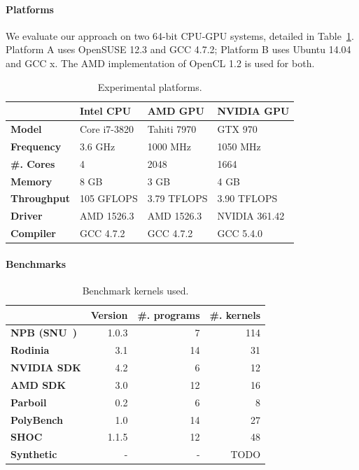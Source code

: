 \documentclass[preprint,nonatbib,10pt,nocopyrightspace]{sigplanconf}
\begin{document}
\paragraph{Platforms} We evaluate our approach on two 64-bit CPU-GPU
systems, detailed in Table~\ref{tab:platforms}. Platform A uses
OpenSUSE 12.3 and GCC 4.7.2; Platform B uses Ubuntu 14.04 and GCC
x. The AMD implementation of OpenCL 1.2 is used for both.

\begin{table}%
  \scriptsize
  \centering
  \begin{tabular}{l l l l}
    \toprule
    & \textbf{Intel CPU} & \textbf{AMD GPU} & \textbf{NVIDIA GPU} \\
    \midrule
    \textbf{Model} & Core i7-3820 & Tahiti 7970 & GTX 970 \\
    \textbf{Frequency} & 3.6 GHz & 1000 MHz & 1050 MHz \\
    \textbf{\#. Cores} & 4 & 2048 & 1664 \\
    \textbf{Memory} & 8 GB & 3 GB & 4 GB \\
    \textbf{Throughput} & 105 GFLOPS & 3.79 TFLOPS & 3.90 TFLOPS \\
    \textbf{Driver} & AMD 1526.3 & AMD 1526.3 & NVIDIA 361.42 \\
    \textbf{Compiler} & GCC 4.7.2 & GCC 4.7.2 & GCC 5.4.0 \\
    \bottomrule
  \end{tabular}
  \caption{Experimental platforms.}
  \label{tab:platforms}
\end{table}


\paragraph{Benchmarks}

%
\begin{table}%
  \scriptsize
  \centering
  \begin{tabular}{l r r r}
    \toprule
    & \textbf{Version} & \textbf{\#. programs} & \textbf{\#. kernels}\\
    \midrule
    \textbf{NPB (SNU~\cite{Seo2011})} & 1.0.3 & 7 & 114 \\
    \textbf{Rodinia~\cite{Che2009}} & 3.1 & 14 & 31 \\
    \textbf{NVIDIA SDK} & 4.2 & 6 & 12 \\
    \textbf{AMD SDK} & 3.0 & 12 & 16 \\
    \textbf{Parboil~\cite{Stratton2012}} & 0.2 & 6 & 8 \\
    \textbf{PolyBench~\cite{Grauer-Gray2012}} & 1.0 & 14 & 27 \\
    \textbf{SHOC~\cite{Danalis2010}} & 1.1.5 & 12 & 48 \\
    \textbf{Synthetic} & - & - & TODO \\
    \bottomrule
  \end{tabular}
  \caption{%
    Benchmark kernels used.
  }
  \label{tab:benchmarks}
\end{table}
\end{document}
